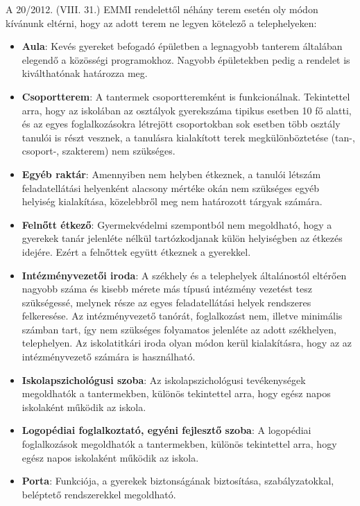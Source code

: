 A 20/2012. (VIII. 31.) EMMI rendelettől néhány terem esetén oly módon
kívánunk eltérni, hogy az adott terem ne legyen kötelező a
telephelyeken:

\begin{itemize}
\item
  \textbf{Aula}: Kevés gyereket befogadó épületben a legnagyobb tanterem
  általában elegendő a közösségi programokhoz. Nagyobb épületekben pedig
  a rendelet is kiválthatónak határozza meg.
\item
  \textbf{Csoportterem}: A tantermek csoportteremként is funkcionálnak.
  Tekintettel arra, hogy az iskolában az osztályok gyerekszáma tipikus
  esetben 10 fő alatti, és az egyes foglalkozásokra létrejött
  csoportokban sok esetben több osztály tanulói is részt vesznek, a
  tanulásra kialakított terek megkülönböztetése (tan-, csoport-,
  szakterem) nem szükséges.
\item
  \textbf{Egyéb raktár}: Amennyiben nem helyben étkeznek, a tanulói
  létszám feladatellátási helyenként alacsony mértéke okán nem szükséges
  egyéb helyiség kialakítása, közelebbről meg nem határozott tárgyak
  számára.
\item
  \textbf{Felnőtt étkező}: Gyermekvédelmi szempontból nem megoldható,
  hogy a gyerekek tanár jelenléte nélkül tartózkodjanak külön
  helyiségben az étkezés idejére. Ezért a felnőttek együtt étkeznek a
  gyerekkel.
\item
  \textbf{Intézményvezetői iroda}: A székhely és a telephelyek
  általánostól eltérően nagyobb száma és kisebb mérete más típusú
  intézmény vezetést tesz szükségessé, melynek része az egyes
  feladatellátási helyek rendszeres felkeresése. Az intézményvezető
  tanórát, foglalkozást nem, illetve minimális számban tart, így nem
  szükséges folyamatos jelenléte az adott székhelyen, telephelyen. Az
  iskolatitkári iroda olyan módon kerül kialakításra, hogy az az
  intézményvezető számára is használható.
\item
  \textbf{Iskolapszichológusi szoba}: Az iskolapszichológusi
  tevékenységek megoldhatók a tantermekben, különös tekintettel arra,
  hogy egész napos iskolaként működik az iskola.
\item
  \textbf{Logopédiai foglalkoztató, egyéni fejlesztő szoba}: A
  logopédiai foglalkozások megoldhatók a tantermekben, különös
  tekintettel arra, hogy egész napos iskolaként működik az iskola.
\item
  \textbf{Porta}: Funkciója, a gyerekek biztonságának biztosítása,
  szabályzatokkal, beléptető rendszerekkel megoldható.

\end{itemize}
